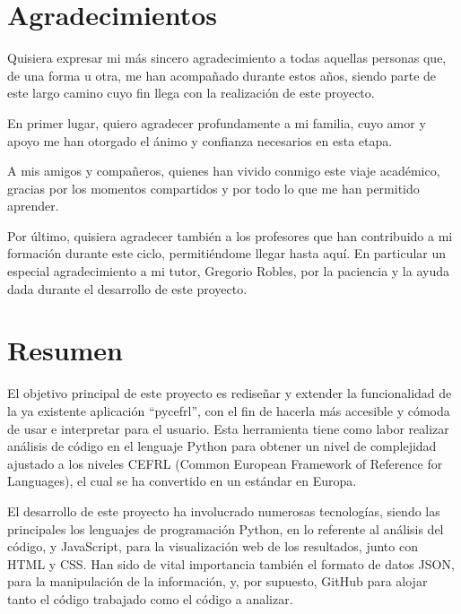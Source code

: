 \documentclass[a4paper, 12pt]{book}
\begin{document}
\chapter*{Agradecimientos}

Quisiera expresar mi más sincero agradecimiento a todas aquellas personas que, de una forma u otra, me han acompañado durante estos años, siendo parte de este largo camino cuyo fin llega con la realización de este proyecto.

En primer lugar, quiero agradecer profundamente a mi familia, cuyo amor y apoyo me han otorgado el ánimo y confianza necesarios en esta etapa.

A mis amigos y compañeros, quienes han vivido conmigo este viaje académico, gracias por los momentos compartidos y por todo lo que me han permitido aprender.

Por último, quisiera agradecer también a los profesores que han contribuido a mi formación durante este ciclo, permitiéndome llegar hasta aquí. En particular un especial agradecimiento a mi tutor, Gregorio Robles, por la paciencia y la ayuda dada durante el desarrollo de este proyecto.

\chapter*{Resumen}

El objetivo principal de este proyecto es rediseñar y extender la funcionalidad de la ya existente aplicación ``pycefrl'', con el fin de hacerla más accesible y cómoda de usar e interpretar para el usuario. Esta herramienta tiene como labor realizar análisis de código en el lenguaje Python para obtener un nivel de complejidad ajustado a los niveles CEFRL (Common European Framework of Reference for Languages), el cual se ha convertido en un estándar en Europa.

El desarrollo de este proyecto ha involucrado numerosas tecnologías, siendo las principales los lenguajes de programación Python, en lo referente al análisis del código, y JavaScript, para la visualización web de los resultados, junto con HTML y CSS. Han sido de vital importancia también el formato de datos JSON, para la manipulación de la información, y, por supuesto, GitHub para alojar tanto el código trabajado como el código a analizar.
\end{document}
